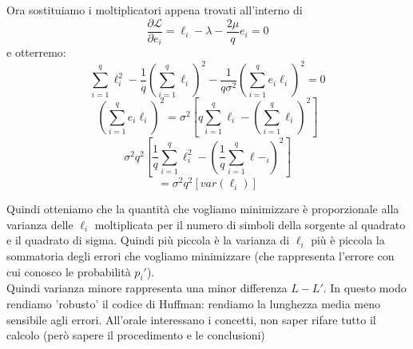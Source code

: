 Ora sostituiamo i moltiplicatori appena trovati all'interno di 
\begin{equation*}
\frac{\partial \mathscr{L}}{\partial e_i} = \ell_i - \lambda - \frac{2\mu}{q}e_i = 0
\end{equation*}
e otterremo:
\begin{equation*}
\sum_{i=1}^q\ell_i^2 - \frac{1}{q}(\sum_{i=1}^q\ell_i)^2-\frac{1}{q\sigma^2}(\sum_{i=1}^qe_i\ell_i)^2 = 0
\end{equation*}
\begin{equation*}
(\sum_{i=1}^qe_i\ell_i)^2 = \sigma^2[q\sum_{i=1}^q\ell_i - (\sum_{i=1}^q\ell_i)^2]
\end{equation*}
\begin{equation*}
\sigma^2q^2[\frac{1}{q}\sum_{i=1}^q\ell_i^2-(\frac{1}{q}\sum_{i=1}^q\ell-_i)^2]
\end{equation*}
\begin{equation*}
= \sigma^2q^2[var(\ell_i)]
\end{equation*}

Quindi otteniamo che la quantità che vogliamo minimizzare è proporzionale alla varianza delle $\ell_i$ moltiplicata per il numero di simboli della sorgente al quadrato e il quadrato di sigma.
Quindi più piccola è la varianza di $\ell_i$ più è piccola la sommatoria degli errori che vogliamo minimizzare (che rappresenta l'errore con cui conosco le probabilità $p_i'$).\\
Quindi varianza minore rappresenta una minor differenza $L - L'$.
In questo modo rendiamo 'robusto' il codice di Huffman: rendiamo la lunghezza media meno sensibile agli errori.
All'orale interessano i concetti, non saper rifare tutto il calcolo (però sapere il procedimento e le conclusioni)